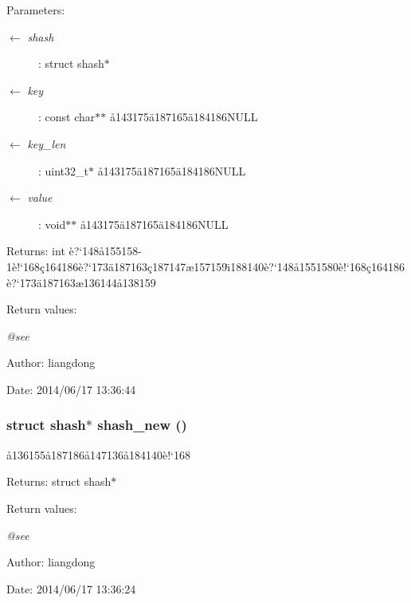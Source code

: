\begin{Desc}
\item[Parameters:]
\begin{description}
\item[\mbox{$\leftarrow$} {\em shash}]: struct shash$\ast$ \item[\mbox{$\leftarrow$} {\em key}]: const char$\ast$$\ast$ \aa{}143175\"{a}187165\"{a}184186NULL \item[\mbox{$\leftarrow$} {\em key\_\-len}]: uint32\_\-t$\ast$ \aa{}143175\"{a}187165\"{a}184186NULL \item[\mbox{$\leftarrow$} {\em value}]: void$\ast$$\ast$ \aa{}143175\"{a}187165\"{a}184186NULL \end{description}
\end{Desc}
\begin{Desc}
\item[Returns:]int \`{e}?`148\aa{}155158-1\`{e}!`168\c{c}164186\`{e}?`173\"{a}187163\c{c}187147\ae{}157159\"{\i}188140\`{e}?`148\aa{}1551580\`{e}!`168\c{c}164186\`{e}?`173\"{a}187163\ae{}136144\aa{}138159 \end{Desc}
\begin{Desc}
\item[Return values:]
\begin{description}
\item[{\em @see}]\end{description}
\end{Desc}
\begin{Desc}
\item[Author:]liangdong \end{Desc}
\begin{Desc}
\item[Date:]2014/06/17 13:36:44 \end{Desc}
\subsubsection{\setlength{\rightskip}{0pt plus 5cm}struct shash$\ast$ shash\_\-new ()}\label{shash_8h_a2}


\aa{}136155\aa{}187186\aa{}147136\aa{}184140\`{e}!`168 

\begin{Desc}
\item[Returns:]struct shash$\ast$ \end{Desc}
\begin{Desc}
\item[Return values:]
\begin{description}
\item[{\em @see}]\end{description}
\end{Desc}
\begin{Desc}
\item[Author:]liangdong \end{Desc}
\begin{Desc}
\item[Date:]2014/06/17 13:36:24 \end{Desc}
